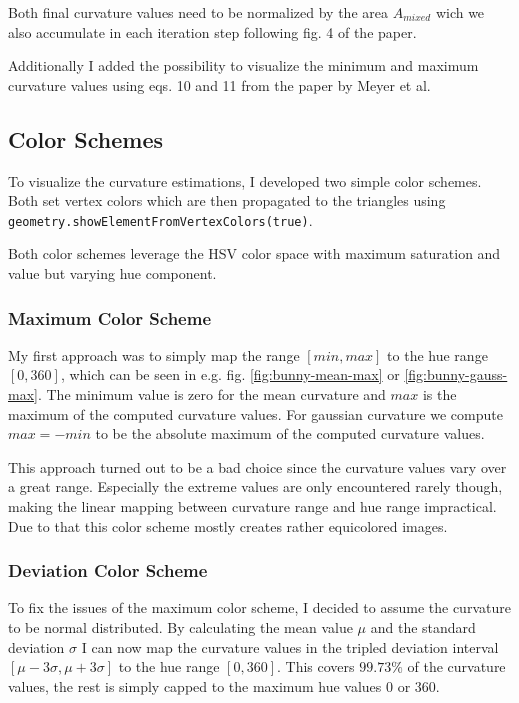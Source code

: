 \documentclass[a4paper,10pt,notitlepage]{scrreprt}
\begin{document}
Both final curvature values need to be normalized by the area $A_{mixed}$ wich
we also accumulate in each iteration step following fig. 4 of the paper.

Additionally I added the possibility to visualize the minimum and maximum
curvature values using eqs. 10 and 11 from the paper by Meyer et al.

\subsection{Color Schemes}

To visualize the curvature estimations, I developed two simple color schemes.
Both set vertex colors which are then propagated to the triangles using \\
\texttt{geometry.showElementFromVertexColors(true)}.

Both color schemes leverage the HSV color space with maximum saturation and
value but varying hue component.

\subsubsection{Maximum Color Scheme}

My first approach was to simply map the range $[min, max]$ to the hue range $[0,
360]$, which can be seen in e.g. fig. \ref{fig:bunny-mean-max} or
\ref{fig:bunny-gauss-max}. The minimum value is zero for the mean
curvature and $max$ is the maximum of the computed curvature values. For
gaussian curvature we compute $max = -min$ to be the absolute maximum of the
computed curvature values.

This approach turned out to be a bad choice since the curvature values vary
over a great range. Especially the extreme values are only encountered rarely
though, making the linear mapping between curvature range and hue range
impractical. Due to that this color scheme mostly creates rather equicolored
images.

\subsubsection{Deviation Color Scheme}

To fix the issues of the maximum color scheme, I decided to assume the
curvature to be normal distributed. By calculating the mean value $\mu$ and the
standard deviation $\sigma$ I can now map the curvature values in the tripled
deviation interval $[\mu - 3 \sigma, \mu + 3 \sigma]$ to the hue range $[0,
360]$. This covers $99.73\%$ of the curvature values, the rest is simply capped
to the maximum hue values $0$ or $360$.
\end{document}
